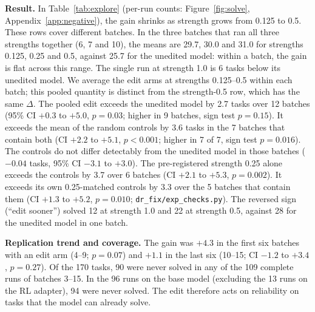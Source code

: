 \textbf{Result.} In Table~\ref{tab:explore} (per-run counts: Figure~\ref{fig:solve}, Appendix~\ref{app:negative}), the gain shrinks as strength grows from 0.125 to 0.5. These rows cover different batches. In the three batches that ran all three strengths together (6, 7 and 10), the means are 29.7, 30.0 and 31.0 for strengths 0.125, 0.25 and 0.5, against 25.7 for the unedited model: within a batch, the gain is flat across this range. The single run at strength 1.0 is 6 tasks below its unedited model. We average the edit arms at strengths 0.125--0.5 within each batch; this pooled quantity is distinct from the strength-0.5 row, which has the same $\Delta$. The pooled edit exceeds the unedited model by 2.7 tasks over 12 batches (95\% CI $+0.3$ to $+5.0$, $p = 0.03$; higher in 9 batches, sign test $p = 0.15$). It exceeds the mean of the random controls by 3.6 tasks in the 7 batches that contain both (CI $+2.2$ to $+5.1$, $p < 0.001$; higher in 7 of 7, sign test $p = 0.016$). The controls do not differ detectably from the unedited model in those batches ($-0.04$ tasks, 95\% CI $-3.1$ to $+3.0$). The pre-registered strength 0.25 alone exceeds the controls by 3.7 over 6 batches (CI $+2.1$ to $+5.3$, $p = 0.002$). It exceeds its own 0.25-matched controls by 3.3 over the 5 batches that contain them (CI $+1.3$ to $+5.2$, $p = 0.010$; \texttt{dr\_fix/exp\_checks.py}). The reversed sign (``edit sooner'') solved 12 at strength 1.0 and 22 at strength 0.5, against 28 for the unedited model in one batch.

\textbf{Replication trend and coverage.} The gain was $+4.3$ in the first six batches with an edit arm (4--9; $p = 0.07$) and $+1.1$ in the last six (10--15; CI $-1.2$ to $+3.4$, $p = 0.27$). Of the 170 tasks, 90 were never solved in any of the 109 complete runs of batches 3--15. In the 96 runs on the base model (excluding the 13 runs on the RL adapter), 94 were never solved. The edit therefore acts on reliability on tasks that the model can already solve.
